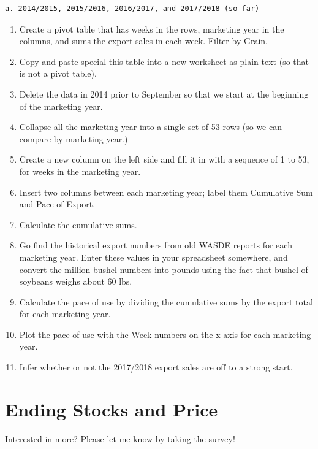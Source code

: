 \documentclass[
  letterpaper,
  DIV=11,
  numbers=noendperiod]{scrreprt}
\begin{document}
\begin{verbatim}
a. 2014/2015, 2015/2016, 2016/2017, and 2017/2018 (so far)  
\end{verbatim}

\begin{enumerate}
\def\labelenumi{\arabic{enumi}.}
\setcounter{enumi}{2}
\item
  Create a pivot table that has weeks in the rows, marketing year in the
  columns, and sums the export sales in each week. Filter by Grain.
\item
  Copy and paste special this table into a new worksheet as plain text
  (so that is not a pivot table).
\item
  Delete the data in 2014 prior to September so that we start at the
  beginning of the marketing year.
\item
  Collapse all the marketing year into a single set of 53 rows (so we
  can compare by marketing year.)
\item
  Create a new column on the left side and fill it in with a sequence of
  1 to 53, for weeks in the marketing year.
\item
  Insert two columns between each marketing year; label them Cumulative
  Sum and Pace of Export.
\item
  Calculate the cumulative sums.
\item
  Go find the historical export numbers from old WASDE reports for each
  marketing year. Enter these values in your spreadsheet somewhere, and
  convert the million bushel numbers into pounds using the fact that
  bushel of soybeans weighs about 60 lbs.
\item
  Calculate the pace of use by dividing the cumulative sums by the
  export total for each marketing year.
\item
  Plot the pace of use with the Week numbers on the x axis for each
  marketing year.
\item
  Infer whether or not the 2017/2018 export sales are off to a strong
  start.
\end{enumerate}


\hypertarget{ending-stocks-and-price}{%
\chapter{Ending Stocks and Price}\label{ending-stocks-and-price}}

{Interested in more? Please let me know by}
\href{https://forms.gle/Q3VByCQZHjfQSy9D7}{taking the survey}!
\end{document}
